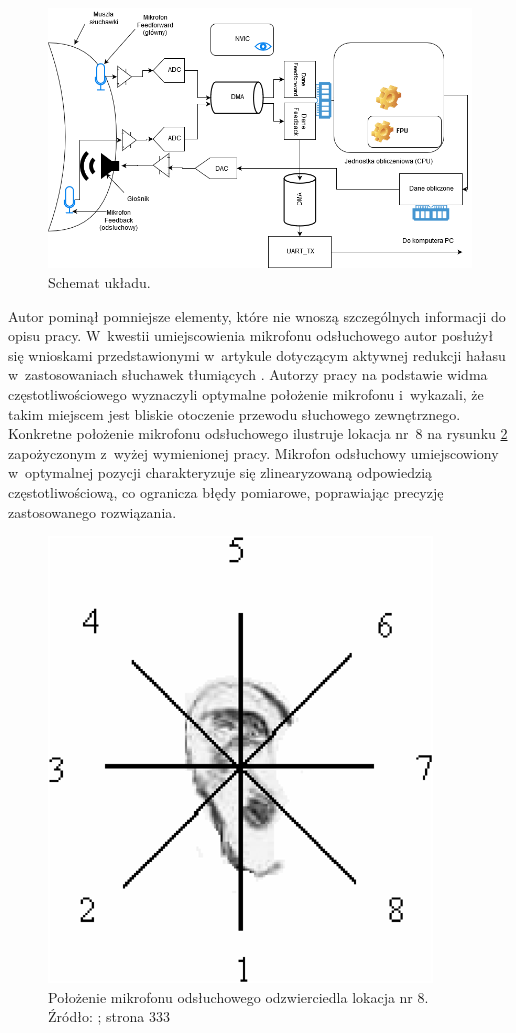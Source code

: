 \begin{figure}[h!]
	\includegraphics[width=\linewidth]{../Assets/schemat_ukladu.png}	
	\caption{Schemat układu.}
	\label{fig:schemat1}
\end{figure}
Autor pominął pomniejsze elementy, które nie wnoszą szczególnych informacji do opisu pracy. W~kwestii umiejscowienia mikrofonu odsłuchowego autor posłużył się wnioskami przedstawionymi w~artykule dotyczącym aktywnej redukcji hałasu w~zastosowaniach słuchawek tłumiących \cite{ANC4HP}. Autorzy pracy na podstawie widma częstotliwościowego wyznaczyli optymalne położenie mikrofonu i~wykazali, że takim miejscem jest bliskie otoczenie przewodu słuchowego zewnętrznego. Konkretne położenie mikrofonu odsłuchowego ilustruje lokacja nr~8 na rysunku \ref{fig:error_mic_placement} zapożyczonym z~wyżej wymienionej pracy.
Mikrofon odsłuchowy umiejscowiony w~optymalnej pozycji charakteryzuje się zlinearyzowaną odpowiedzią częstotliwościową, co ogranicza błędy pomiarowe, poprawiając precyzję zastosowanego rozwiązania.
\begin{figure}[h!]
	\centering
	\includegraphics[scale=0.6]{../Assets/error_mic_placement.png}
	\caption{Położenie mikrofonu odsłuchowego odzwierciedla lokacja nr 8.\\ Źródło: ; strona 333}
	\label{fig:error_mic_placement}
\end{figure}

